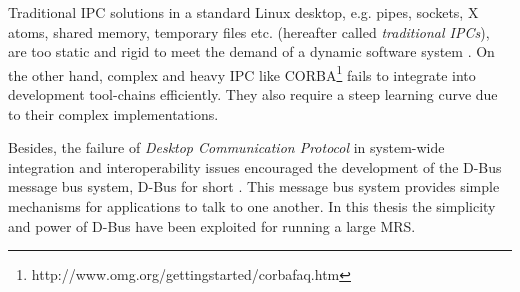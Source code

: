 Traditional IPC solutions in a standard Linux desktop, e.g. pipes, sockets, X atoms, shared memory, temporary files etc. (hereafter called {\em traditional IPCs}), are too static and rigid to meet the demand of a dynamic software system \cite{wittenburg2005}. On the other hand, complex and heavy IPC like CORBA\footnote{http://www.omg.org/gettingstarted/corbafaq.htm} fails to integrate into development tool-chains efficiently. They also require a steep learning curve due to their complex implementations. 

Besides, the failure of \textit{Desktop Communication Protocol} in system-wide integration and interoperability issues encouraged the development of the D-Bus message bus system, D-Bus for short \cite{Pennington+2010}. This message bus system provides simple mechanisms for applications to talk to one another. In this thesis the simplicity and power of D-Bus have been exploited for running a large MRS.

